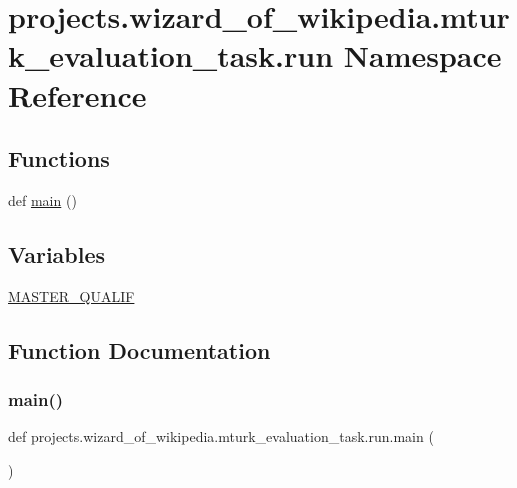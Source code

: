 \hypertarget{namespaceprojects_1_1wizard__of__wikipedia_1_1mturk__evaluation__task_1_1run}{}\section{projects.\+wizard\+\_\+of\+\_\+wikipedia.\+mturk\+\_\+evaluation\+\_\+task.\+run Namespace Reference}
\label{namespaceprojects_1_1wizard__of__wikipedia_1_1mturk__evaluation__task_1_1run}
\subsection*{Functions}
\begin{DoxyCompactItemize}
\item 
def \hyperlink{namespaceprojects_1_1wizard__of__wikipedia_1_1mturk__evaluation__task_1_1run_ad3ab2c71f8083c3112815c0b363d316b}{main} ()
\end{DoxyCompactItemize}
\subsection*{Variables}
\begin{DoxyCompactItemize}
\item 
\hyperlink{namespaceprojects_1_1wizard__of__wikipedia_1_1mturk__evaluation__task_1_1run_a2ce00820b3cae0179fb07035320bfc6f}{M\+A\+S\+T\+E\+R\+\_\+\+Q\+U\+A\+L\+IF}
\end{DoxyCompactItemize}


\subsection{Function Documentation}
\mbox{\label{namespaceprojects_1_1wizard__of__wikipedia_1_1mturk__evaluation__task_1_1run_ad3ab2c71f8083c3112815c0b363d316b}} 
\subsubsection{\texorpdfstring{main()}{main()}}
{\footnotesize\ttfamily def projects.\+wizard\+\_\+of\+\_\+wikipedia.\+mturk\+\_\+evaluation\+\_\+task.\+run.\+main (\begin{DoxyParamCaption}{ }\end{DoxyParamCaption})}

